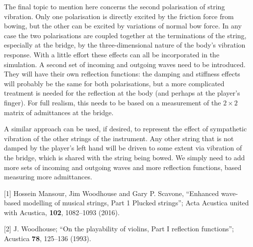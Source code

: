 
  The final topic to mention here concerns the second polarisation of string 
  vibration. Only one polarisation is directly excited by the friction force 
  from bowing, but the other can be excited by variations of normal bow force. 
  In any case the two polarisations are coupled together at the terminations of 
  the string, especially at the bridge, by the three-dimensional nature of the 
  body’s vibration response. With a little effort these effects can all be 
  incorporated in the simulation. A second set of incoming and outgoing waves 
  need to be introduced. They will have their own reflection functions: the 
  damping and stiffness effects will probably be the same for both 
  polarisations, but a more complicated treatment is needed for the reflection 
  at the body (and perhaps at the player's finger). For full realism, this 
  needs to be based on a measurement of the $2 \times 2$ matrix of admittances 
  at the bridge. 

  A similar approach can be used, if desired, to represent the effect of 
  sympathetic vibration of the other strings of the instrument. Any other 
  string that is not damped by the player's left hand will be driven to some 
  extent via vibration of the bridge, which is shared with the string being 
  bowed. We simply need to add more sets of incoming and outgoing waves and 
  more reflection functions, based measuring more admittances. 

  \sectionreferences{}[1] Hossein Mansour, Jim Woodhouse and Gary P. Scavone, 
  “Enhanced wave-based modelling of musical strings, Part 1 Plucked strings”; 
  Acta Acustica united with Acustica, \textbf{102}, 1082–1093 (2016). 

  [2] J. Woodhouse; “On the playability of violins, Part I reflection 
  functions”; Acustica \textbf{78}, 125–136 (1993). 
